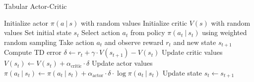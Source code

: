 \begin{algorithm}[H]
  \caption{Tabular Actor-Critic}
  \label{alg:actor_critic}
  \begin{algorithmic}
    \State Initialize actor $\pi(a~|~s)$ with random values
    \State Initialize critic $V(s)$ with random values
    \State Set initial state $s_t$
    \State Select action $a_t$ from policy $\pi(a_t~|~s_t)$ using weighted random sampling
    \State Take action $a_t$ and observe reward $r_t$ and new state $s_{t+1}$
    \State Compute TD error $\delta \gets r_t+\gamma\cdot V(s_{t+1}) - V(s_t)$
    \State Update critic values $V(s_t) \gets V(s_t) + \alpha_\text{critic}\cdot\delta$
    \State Update actor values $\pi(a_t~|~s_t) \gets \pi(a_t~|~s_t) + \alpha_\text{actor}\cdot\delta\cdot\log\pi(a_t~|~s_t)$
    \State Update state $s_t \gets s_{t+1}$
    \EndWhile
    \EndFor
  \end{algorithmic}
\end{algorithm}
